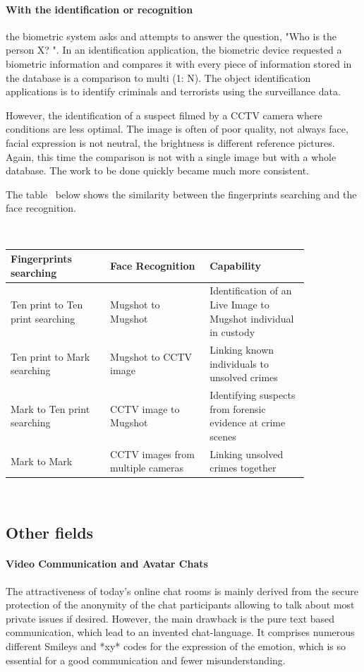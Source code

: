 \paragraph{With the identification or recognition} the biometric system asks and attempts to answer the question, "Who is the person X? ". In an identification application, the biometric device requested a biometric information and compares it with every piece of information stored in the database is a comparison to multi (1: N). The object identification applications is to identify criminals and terrorists using the surveillance data.

However, the identification of a suspect filmed by a CCTV camera where conditions are less optimal.
The image is often of poor quality, not always face, facial expression is not neutral, the brightness is different reference pictures.
Again, this time the comparison is not with a single image but with a whole database. The work to be done quickly became much more consistent.

The table~\cite{NPIA} below shows the similarity between the fingerprints searching and the face recognition.

~\\
\begin{tabular}{|p{0.28\linewidth}|p{0.28\linewidth}|p{0.28\linewidth}|}
\hline
\textbf{Fingerprints searching}&\textbf{Face Recognition}&\textbf{Capability}\\
\hline
Ten print to Ten print searching&Mugshot to Mugshot&Identification of an Live Image to Mugshot individual in custody\\
\hline
Ten print to Mark searching&Mugshot to CCTV image&Linking known individuals to unsolved crimes\\
\hline
Mark to Ten print searching&CCTV image to Mugshot&Identifying suspects from forensic evidence at crime scenes\\
\hline
Mark to Mark&CCTV images from multiple cameras&Linking unsolved crimes together\\
\hline
\end{tabular}

~\\

\subsection{Other fields}
\paragraph*{Video Communication and Avatar Chats}
The attractiveness of today's online chat rooms is mainly derived from the secure protection of the anonymity of the chat participants allowing to talk about most private issues if desired. However, the main drawback is the pure text based communication, which lead to an invented chat-language. It comprises numerous different Smileys and *xy* codes for the expression of the emotion, which is so essential for a good communication and fewer misunderstanding.

